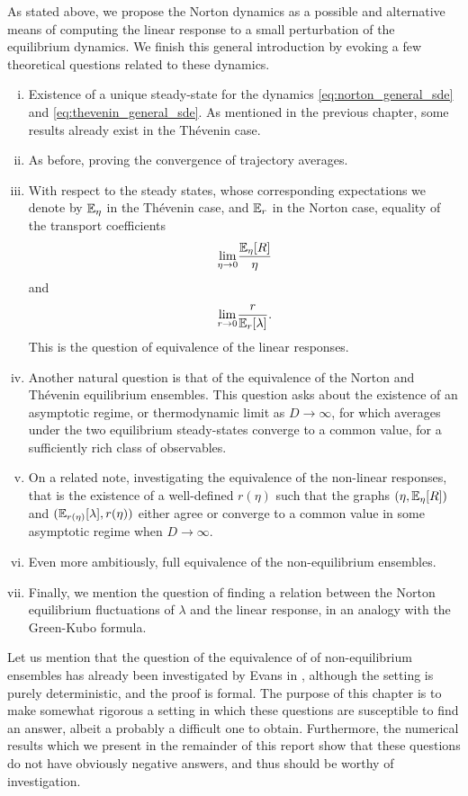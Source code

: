 As stated above, we propose the Norton dynamics as a possible and alternative means of computing the linear response to a small perturbation of the equilibrium dynamics. 
We finish this general introduction by evoking a few theoretical questions related to these dynamics.
\begin{enumerate}[(i)]
    \item Existence of a unique steady-state for the dynamics \eqref{eq:norton_general_sde} and \eqref{eq:thevenin_general_sde}. As mentioned in the previous chapter, some results already exist in the Thévenin case.
    \item As before, proving the convergence of trajectory averages.
    \item With respect to the steady states, whose corresponding expectations we denote by $\mathbb{E}_\eta$ in the Thévenin case, and $\mathbb{E}_r$ in the Norton case, equality of the transport coefficients \[\underset{\eta \to 0}{\lim}\frac{\mathbb{E}_\eta[R]}{\eta}\] and \[\underset{r\to 0}{\lim}\frac{r}{\mathbb{E}_r[\lambda]}.\] This is the question of equivalence of the linear responses.
    \item Another natural question is that of the equivalence of the Norton and Thévenin equilibrium ensembles. This question asks about the existence of an asymptotic regime, or thermodynamic limit as $D\to\infty$, for which averages under the two equilibrium steady-states converge to a common value, for a sufficiently rich class of observables.
    \item On a related note, investigating the equivalence of the non-linear responses, that is the existence of a well-defined $r(\eta)$ such that the graphs $(\eta,\mathbb{E}_\eta[R])$ and $(\mathbb{E}_{r(\eta)}[\lambda],r(\eta))$ either agree or converge to a common value in some asymptotic regime when $D\to\infty$.
    \item Even more ambitiously, full equivalence of the non-equilibrium ensembles.
    \item Finally, we mention the question of finding a relation between the Norton equilibrium fluctuations of $\lambda$ and the linear response, in an analogy with the Green-Kubo formula.
\end{enumerate}
Let us mention that the question of the equivalence of of non-equilibrium ensembles has already been investigated by Evans in \cite{E93}, although the setting is purely deterministic, and the proof is formal.
The purpose of this chapter is to make somewhat rigorous a setting in which these questions are susceptible to find an answer, albeit a probably a difficult one to obtain.
Furthermore, the numerical results which we present in the remainder of this report show that these questions do not have obviously negative answers, and thus should be worthy of investigation.

